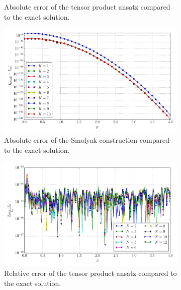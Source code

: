 \documentclass[a4paper,10pt]{article}
\begin{document}
\begin{figure}[ht!]
\begin{subfigure}[t]{0.5\linewidth}
    \caption{Absolute error of the tensor product ansatz compared to the exact solution.}
    \label{fig:tp_sg_3d_conv_p_011_110_err_nsd_tp}
  \end{subfigure}
  \begin{subfigure}[t]{0.5\linewidth}
    \includegraphics[width=\linewidth]{./plots/tp_sg_3d_conv_p_(0,1,1)_(1,1,0)_err_nsd_gk.pdf}
    \caption{Absolute error of the Smolyak construction compared to the exact solution.}
    \label{fig:tp_sg_3d_conv_p_011_110_err_nsd_gk}
  \end{subfigure}
  \begin{subfigure}[t]{0.5\linewidth}
    \includegraphics[width=\linewidth]{./plots/tp_sg_3d_conv_p_(0,1,1)_(1,1,0)_err_rel_nsd_tp.pdf}
    \caption{Relative error of the tensor product ansatz compared to the exact solution.}
    \label{fig:tp_sg_3d_conv_p_011_110_err_rel_nsd_tp}
  \end{subfigure}
  \begin{subfigure}[t]{0.5\linewidth}

\end{subfigure}
\end{figure}
\end{document}
